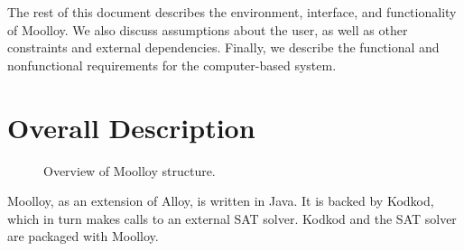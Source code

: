 \documentclass[11pt]{article}
\theoremstyle{definition}
\begin{document}
The rest of this document describes the environment, interface, and
functionality of Moolloy. We also discuss assumptions about the user,
as well as other constraints and external dependencies. Finally, we
describe the functional and nonfunctional requirements for the
computer-based system.

\section{Overall Description}\label{sec:overall_desc}

\begin{figure}
  \centering
    \tikzset{>=latex}
  \caption{Overview of Moolloy structure.}
\end{figure}


Moolloy, as an extension of Alloy, is written in Java. It is backed by
Kodkod, which in turn makes calls to an external SAT solver. Kodkod and
the SAT solver are packaged with Moolloy.
\end{document}
